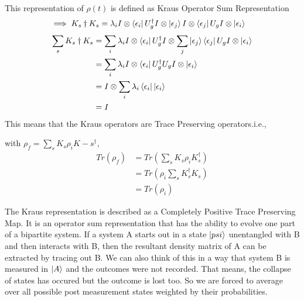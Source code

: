 This representation of $\rho(t)$ is defined as Kraus Operator Sum Representation
\begin{equation}
\begin{aligned}
    \implies K_s\dagger K_s &= \lambda_i I \otimes \bra{\epsilon_i} U_g^\dagger I \otimes \ket{\epsilon_j} I \otimes \bra{\epsilon_j} U_g I \otimes \ket{\epsilon_i}
\end{aligned}
\end{equation}
\begin{equation}
\begin{aligned}
    \sum_s K_s\dagger K_s &= \sum_i \lambda_i I \otimes \bra{\epsilon_i} U_g^\dagger I \otimes \sum_j \ket{\epsilon_j} \bra{\epsilon_j} U_g I \otimes \ket{\epsilon_i} \\
    & = \sum_i \lambda_i I \otimes \bra{\epsilon_i} U_g^\dagger U_g I \otimes \ket{\epsilon_i} \\
    & = I \otimes \sum_i \lambda_i \bra{\epsilon_i} \ket{\epsilon_i} \\
    & = I
\end{aligned}
\end{equation}
This means that the Kraus operators are Trace Preserving operators.i.e.,

with $\rho_f = \sum_s K_s \rho_i K-s^\dagger$,
\begin{equation}
    \begin{aligned}
        Tr (\rho_f) &= Tr(\sum_s K_s \rho_i K_s^\dagger) \\
        & = Tr(\rho_i \sum_s K_s^\dagger K_s) \\
        & = Tr(\rho_i)
    \end{aligned}
\end{equation}

The Kraus representation is described as a Completely Positive Trace Preserving Map. It is an operator sum representation that has the ability to evolve one part of a bipartite system. If a system A starts out in a state $\ket{psi}$ unentangled with B and then interacts with B, then the resultant density matrix of A can be extracted by tracing out B. We can also think of this in a way that system B is measured in $\ket A$ and the outcomes were not recorded. That means, the collapse of states has occured but the outcome is lost too. So we are forced to average over all possible post measurement states weighted by their probabilities.

